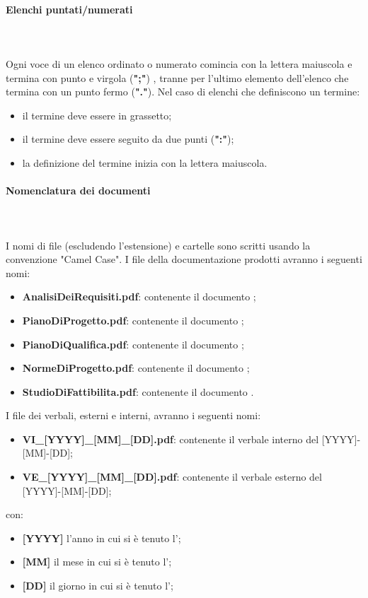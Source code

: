 \paragraph{Elenchi puntati/numerati}\mbox{} \\ \\
Ogni voce di un elenco ordinato o numerato comincia con la lettera maiuscola e termina con punto e virgola (\textbf{";"}) , tranne per l'ultimo elemento dell'elenco che termina con un punto fermo (\textbf{"."}).
Nel caso di elenchi che definiscono un termine:
\begin{itemize}
    \item il termine deve essere in grassetto;
    \item il termine deve essere seguito da due punti (\textbf{":"});
    \item la definizione del termine inizia con la lettera maiuscola.
\end{itemize}

\paragraph{Nomenclatura dei documenti}\mbox{} \\ \\
I nomi di file (escludendo l'estensione) e cartelle sono scritti usando la convenzione "Camel Case".
I file della documentazione prodotti avranno i seguenti nomi:
\begin{itemize}
    \item \textbf{AnalisiDeiRequisiti.pdf}: contenente il documento \AdR{};
    \item \textbf{PianoDiProgetto.pdf}: contenente il documento \PdP{};
    \item \textbf{PianoDiQualifica.pdf}: contenente il documento \PdQ{};
    \item \textbf{NormeDiProgetto.pdf}: contenente il documento \NdP{};
    \item \textbf{StudioDiFattibilita.pdf}: contenente il documento \SdF{}.
\end{itemize}
I file dei verbali, esterni e interni, avranno i seguenti nomi:
\begin{itemize}
    \item \textbf{VI\_[YYYY]\_[MM]\_[DD].pdf}: contenente il verbale interno del [YYYY]-[MM]-[DD];
    \item \textbf{VE\_[YYYY]\_[MM]\_[DD].pdf}: contenente il verbale esterno del [YYYY]-[MM]-[DD];
\end{itemize}
con:
\begin{itemize}
    \item \textbf{[YYYY]} l'anno in cui si è tenuto l';
    \item \textbf{[MM]} il mese in cui si è tenuto l';
    \item \textbf{[DD]} il giorno in cui si è tenuto l';
\end{itemize}

